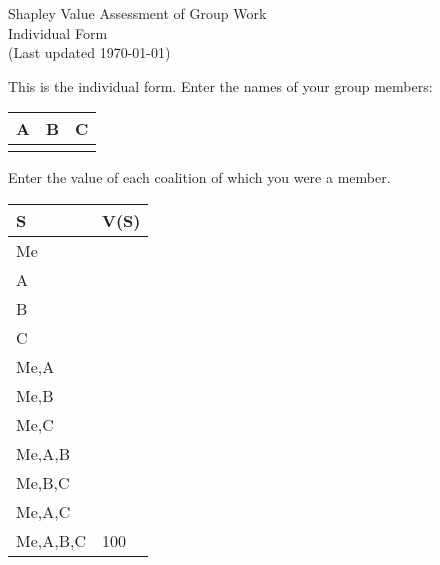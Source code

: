 \documentclass[12pt]{article}
\begin{document}
\begin{center}
\Large{Shapley Value Assessment of Group Work}\\
Individual Form\\
\tiny{(Last updated \today)}
\end{center}

\vspace{2cm}
This is the individual form. Enter the names of your group members:
\vspace{2cm}

\begin{center}
\begin{tabular}{p{3cm}|p{3cm}|p{3cm}}
A&B&C\\
\hline
&&
\end{tabular}
\end{center}
\vspace{2cm}

Enter the value of each coalition of which you were a member.
\vspace{1cm}

\begin{center}
\begin{tabular}{l|p{2cm}}
S&V(S)\\\hline
Me&\\\hline
A&\\\hline
B&\\\hline
C&\\\hline
Me,A&\\\hline
Me,B&\\\hline
Me,C&\\\hline
Me,A,B&\\\hline
Me,B,C&\\\hline
Me,A,C&\\\hline
Me,A,B,C&100
\end{tabular}
\end{center}
\end{document}
